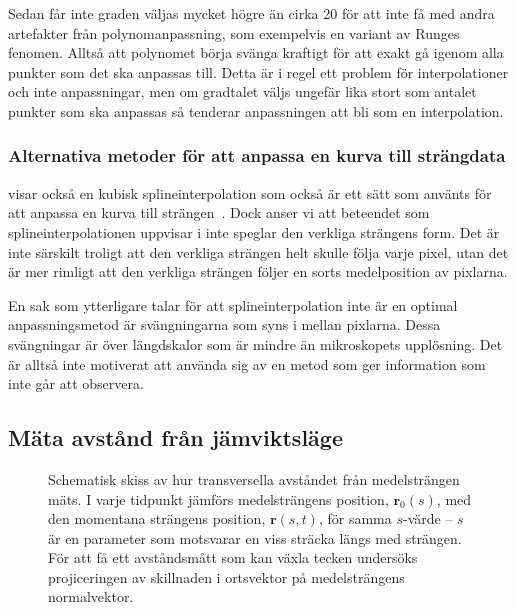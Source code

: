 Sedan får inte graden väljas mycket högre än cirka 20 för att inte få med andra artefakter från polynomanpassning, som exempelvis en variant av Runges fenomen\cite{Gustafsson_LaNa}. Alltså att polynomet börja svänga kraftigt för att exakt gå igenom alla punkter som det ska anpassas till. Detta är i regel ett problem för interpolationer och inte anpassningar, men om gradtalet väljs ungefär lika stort som antalet punkter som ska anpassas så tenderar anpassningen att bli som en interpolation.


\subsubsection{Alternativa metoder för att anpassa en kurva till strängdata}

 visar också en kubisk splineinterpolation som också är ett sätt som använts för att anpassa en kurva till strängen~\cite{Koster_etal2005,Koster_etal2007}. Dock anser vi att beteendet som splineinterpolationen uppvisar i  inte speglar den verkliga strängens form. Det är inte särskilt troligt att den verkliga strängen helt skulle följa varje pixel, utan det är mer rimligt att den verkliga strängen följer en sorts medelposition av pixlarna. 

En sak som ytterligare talar för att splineinterpolation inte är en optimal anpassningsmetod är svängningarna %
som syns i  mellan pixlarna. Dessa svängningar är över längdskalor som är mindre än mikroskopets upplösning. Det är alltså inte motiverat att använda sig av en metod som ger information som inte går att observera. 


\subsection{Mäta avstånd från jämviktsläge}

\begin{figure}
\centering
\resizebox{0.8\textwidth}{!}{
    
}
\caption{Schematisk skiss av hur transversella avståndet från medelsträngen mäts. I varje tidpunkt jämförs medelsträngens position, $\mathbf{r}_0(s)$, med den momentana strängens position, $\mathbf{r}(s, t)$, för samma $s$-värde -- $s$ är en parameter som motsvarar en viss sträcka längs med strängen. För att få ett avståndsmått som kan växla tecken undersöks projiceringen av skillnaden i ortsvektor på medelsträngens normalvektor. 
}
\label{fig:transv_avst}
\end{figure}

